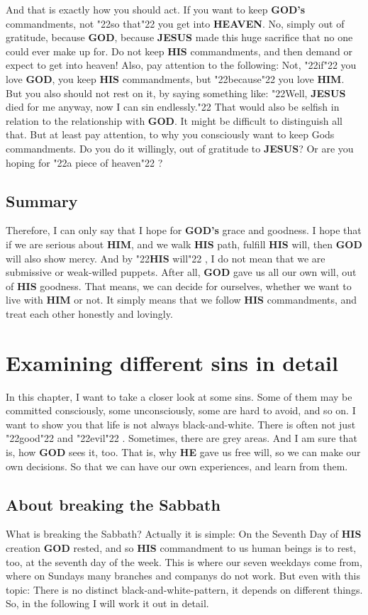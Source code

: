 \documentclass[12pt,a5paper]{article}
\newcommand{\God}[0]{\textbf{GOD}}
\newcommand{\Gods}[0]{\textbf{GOD's}}
\newcommand{\He}[0]{\textbf{HE}}
\newcommand{\Heaven}[0]{\textbf{HEAVEN}}
\newcommand{\Him}[0]{\textbf{HIM}}
\newcommand{\His}[0]{\textbf{HIS}}
\newcommand{\Jesus}[0]{\textbf{JESUS}}
\newcommand{\q}[1]{\char"22{#1}\char"22 }
\begin{document}
		And that is exactly how you should act.
		If you want to keep {\Gods} commandments,
		not \q{so that} you get into {\Heaven}.
		No,
		simply out of gratitude,
		because {\God},
		because {\Jesus} made this huge sacrifice that no one could ever make up for.
		Do not keep {\His} commandments,
		and then demand or expect to get into heaven!
		Also,
		pay attention to the following:
		Not,
		\q{if} you love {\God},
		you keep {\His} commandments,
		but \q{because} you love {\Him}.
		But you also should not rest on it,
		by saying something like:
		\q{Well,
		{\Jesus} died for me anyway,
		now I can sin endlessly.}
		That would also be selfish in relation to the relationship with {\God}.
		It might be difficult to distinguish all that.
		But at least pay attention,
		to why you consciously want to keep {Gods} commandments.
		Do you do it willingly,
		out of gratitude to {\Jesus}?
		Or are you hoping for \q{a piece of heaven}?
		
	\subsection{Summary}
		Therefore,
		I can only say that I hope for {\Gods} grace and goodness.
		I hope that if we are serious about {\Him},
		and we walk {\His} path,
		fulfill {\His} will,
		then {\God} will also show mercy.
		And by \q{{\His} will},
		I do not mean that we are submissive or weak-willed puppets.
		After all,
		{\God} gave us all our own will,
		out of {\His} goodness.
		That means,
		we can decide for ourselves,
		whether we want to live with {\Him} or not.
		It simply means that we follow {\His} commandments,
		and treat each other honestly and lovingly.

	\newpage
	\section{Examining different sins in detail}
		In this chapter,
		I want to take a closer look at some sins.
		Some of them may be committed consciously,
		some unconsciously,
		some are hard to avoid,
		and so on.
		I want to show you that life is not always black-and-white.
		There is often not just \q{good} and \q{evil}.
		Sometimes,
		there are grey areas.
		And I am sure that is,
		how {\God} sees it,
		too.
		That is,
		why {\He} gave us free will,
		so we can make our own decisions.
		So that we can have our own experiences,
		and learn from them.

	\subsection{About breaking the Sabbath}
		What is breaking the Sabbath?
		Actually it is simple:
		On the Seventh Day of {\His} creation {\God} rested,
		and so {\His} commandment to us human beings is to rest,
		too,
		at the seventh day of the week.
		This is where our seven weekdays come from,
		where on Sundays many branches and companys do not work.
		But even with this topic:
		There is no distinct black-and-white-pattern,
		it depends on different things.
		So,
		in the following I will work it out in detail.
	
\end{document}
